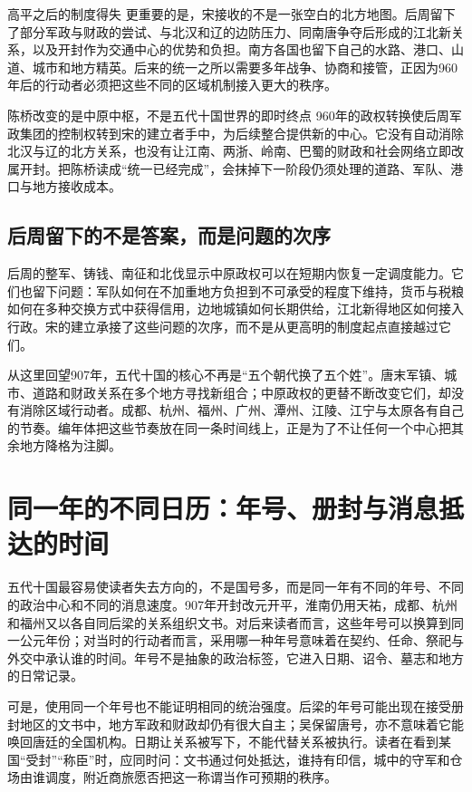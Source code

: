 \begin{causalchain}{高平之后的制度得失}
更重要的是，宋接收的不是一张空白的北方地图。后周留下了部分军政与财政的尝试、与北汉和辽的边防压力、同南唐争夺后形成的江北新关系，以及开封作为交通中心的优势和负担。南方各国也留下自己的水路、港口、山道、城市和地方精英。后来的统一之所以需要多年战争、协商和接管，正因为960年后的行动者必须把这些不同的区域机制接入更大的秩序。

\begin{turningpoint}{陈桥改变的是中原中枢，不是五代十国世界的即时终点}
960年的政权转换使后周军政集团的控制权转到宋的建立者手中，为后续整合提供新的中心。它没有自动消除北汉与辽的北方关系，也没有让江南、两浙、岭南、巴蜀的财政和社会网络立即改属开封。把陈桥读成“统一已经完成”，会抹掉下一阶段仍须处理的道路、军队、港口与地方接收成本。
\end{turningpoint}

\subsection{后周留下的不是答案，而是问题的次序}

后周的整军、铸钱、南征和北伐显示中原政权可以在短期内恢复一定调度能力。它们也留下问题：军队如何在不加重地方负担到不可承受的程度下维持，货币与税粮如何在多种交换方式中获得信用，边地城镇如何长期供给，江北新得地区如何接入行政。宋的建立承接了这些问题的次序，而不是从更高明的制度起点直接越过它们。

从这里回望907年，五代十国的核心不再是“五个朝代换了五个姓”。唐末军镇、城市、道路和财政关系在多个地方寻找新组合；中原政权的更替不断改变它们，却没有消除区域行动者。成都、杭州、福州、广州、潭州、江陵、江宁与太原各有自己的节奏。编年体把这些节奏放在同一条时间线上，正是为了不让任何一个中心把其余地方降格为注脚。

\section{同一年的不同日历：年号、册封与消息抵达的时间}

五代十国最容易使读者失去方向的，不是国号多，而是同一年有不同的年号、不同的政治中心和不同的消息速度。907年开封改元开平，淮南仍用天祐，成都、杭州和福州又以各自同后梁的关系组织文书。对后来读者而言，这些年号可以换算到同一公元年份；对当时的行动者而言，采用哪一种年号意味着在契约、任命、祭祀与外交中承认谁的时间。年号不是抽象的政治标签，它进入日期、诏令、墓志和地方的日常记录。

可是，使用同一个年号也不能证明相同的统治强度。后梁的年号可能出现在接受册封地区的文书中，地方军政和财政却仍有很大自主；吴保留唐号，亦不意味着它能唤回唐廷的全国机构。日期让关系被写下，不能代替关系被执行。读者在看到某国“受封”“称臣”时，应同时问：文书通过何处抵达，谁持有印信，城中的守军和仓场由谁调度，附近商旅愿否把这一称谓当作可预期的秩序。


\end{causalchain}
